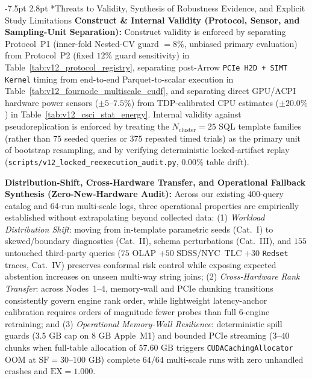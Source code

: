 \documentclass[10pt,a4paper]{article}
\makeatletter
\renewcommand\subsection{\@startsection{subsection}{2}{\z@}%
  {-7.5pt \@plus -2pt \@minus -1pt}%
  {2.8pt \@plus 1pt}%
  {\normalfont\normalsize\bfseries}}
\makeatother
\begin{document}
\subsection*{Threats to Validity, Synthesis of Robustness Evidence, and Explicit Study Limitations}
\noindent\textbf{Construct \& Internal Validity (Protocol, Sensor, and Sampling-Unit Separation):} Construct validity is enforced by separating Protocol~P1 (inner-fold Nested-CV guard $=8\%$, unbiased primary evaluation) from Protocol~P2 (fixed $12\%$ guard sensitivity) in Table~\ref{tab:v12_protocol_registry}, separating post-Arrow \texttt{PCIe H2D + SIMT Kernel} timing from end-to-end Parquet-to-scalar execution in Table~\ref{tab:v12_fournode_multiscale_cudf}, and separating direct GPU/ACPI hardware power sensors ($\pm 5\text{--}7.5\%$) from TDP-calibrated CPU estimates ($\pm 20.0\%$) in Table~\ref{tab:v12_csci_stat_energy}. Internal validity against pseudoreplication is enforced by treating the $N_{\text{cluster}}=25$ SQL template families (rather than $75$ seeded queries or $375$ repeated timed trials) as the primary unit of bootstrap resampling, and by verifying deterministic locked-artifact replay (\texttt{scripts/v12\_\allowbreak{}locked\_\allowbreak{}reexecution\_\allowbreak{}audit.py}, $0.00\%$ table drift).

\noindent\textbf{Distribution-Shift, Cross-Hardware Transfer, and Operational Fallback Synthesis (Zero-New-Hardware Audit):} Across our existing 400-query catalog and 64-run multi-scale logs, three operational properties are empirically established without extrapolating beyond collected data: (1) \emph{Workload Distribution Shift}: moving from in-template parametric seeds (Cat.~I) to skewed/boundary diagnostics (Cat.~II), schema perturbations (Cat.~III), and $155$ untouched third-party queries ($75$ OLAP $+ 50$ SDSS/NYC~TLC $+ 30$ \texttt{Redset} traces, Cat.~IV) preserves conformal risk control while exposing expected abstention increases on unseen multi-way string joins; (2) \emph{Cross-Hardware Rank Transfer}: across Nodes~1--4, memory-wall and PCIe chunking transitions consistently govern engine rank order, while lightweight latency-anchor calibration requires orders of magnitude fewer probes than full $6$-engine retraining; and (3) \emph{Operational Memory-Wall Resilience}: deterministic spill guards ($3.5\text{ GB}$ cap on $8\text{ GB}$ Apple~M1) and bounded PCIe streaming ($3\text{--}40$ chunks when full-table allocation of $57.60\text{ GB}$ triggers \texttt{CUDACachingAllocator} OOM at $\text{SF}=30\text{--}100\text{ GB}$) complete $64/64$ multi-scale runs with zero unhandled crashes and $\text{EX}=1.000$.
\end{document}
